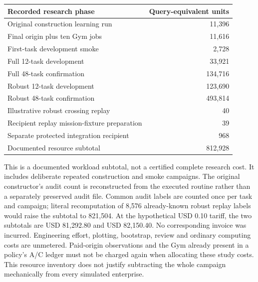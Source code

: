 \begin{center}\small\begin{tabular}{lr}
\toprule
Recorded research phase & Query-equivalent units \\ \midrule
Original construction learning run & 11,396 \\
Final origin plus ten Gym jobs & 11,616 \\
First-task development smoke & 2,728 \\
Full 12-task development & 33,921 \\
Full 48-task confirmation & 134,716 \\
Robust 12-task development & 123,690 \\
Robust 48-task confirmation & 493,814 \\
Illustrative robust crossing replay & 40 \\
Recipient replay mission-fixture preparation & 39 \\
Separate protected integration recipient & 968 \\
Documented resource subtotal & 812,928 \\
\bottomrule
\end{tabular}\end{center}
This is a documented workload subtotal, not a certified complete research cost. It includes deliberate repeated construction and smoke campaigns. The original constructor's audit count is reconstructed from the executed routine rather than a separately preserved audit file. Common audit labels are counted once per task and campaign; literal recomputation of 8,576 already-known robust replay labels would raise the subtotal to 821,504. At the hypothetical USD 0.10 tariff, the two subtotals are USD 81,292.80 and USD 82,150.40. No corresponding invoice was incurred. Engineering effort, plotting, bootstrap, review and ordinary computing costs are unmetered. Paid-origin observations and the Gym already present in a policy's A/C ledger must not be charged again when allocating these study costs. This resource inventory does not justify subtracting the whole campaign mechanically from every simulated enterprise.
